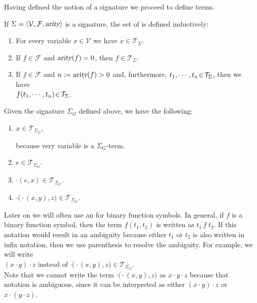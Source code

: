 \noindent
Having defined the notion of a signature we proceed to define terms.

\begin{Definition}
  If $\Sigma = \langle \mathcal{V}, \mathcal{F}, \textsl{arity} \rangle$ is a signature, the set of
     
   is defined inductively:
  \begin{enumerate}
  \item For every variable $x \in \mathcal{V}$ we have $x \in \mathcal{T}_\Sigma$.
  \item If $f \in \mathcal{F}$ and $\textsl{arity}(f) = 0$, then $f \in \mathcal{T}_\Sigma$.
  \item If $f \in \mathcal{F}$ and $n := \textsl{arity}(f) > 0$ and, furthermore, $t_1,\cdots,t_n \!\in\! \mathcal{T}_\Sigma$,  then we have
        \\[0.2cm]
        \hspace*{1.3cm} $f(t_1,\cdots,t_n) \!\in\! \mathcal{T}_\Sigma$.
        \eoxs
  \end{enumerate}
\end{Definition}

\example
Given the signature $\Sigma_G$ defined above, we have the following:
\begin{enumerate}
\item $x \in \mathcal{T}_{\Sigma_G}$,
  
      because very variable is a $\Sigma_{G}$-term.
\item $e \in \mathcal{T}_{\Sigma_G}$.
\item $\cdot(e,x) \in \mathcal{T}_{\Sigma_G}$.
\item $\cdot\bigl(\cdot(x,y),z\bigr) \in \mathcal{T}_{\Sigma_G}$.
\end{enumerate}

\remark
Later on we will often use an  for binary function symbols.  In general, if $f$ is a
binary function symbol, then the term $f(t_1,t_2)$ is written as $t_1 \,f\; t_2$.  If this notation would
result in an ambiguity because either $t_1$ or $t_2$ is also written in infix notation, then we use parenthesis
to resolve the ambiguity.  For example, we will write
\\[0.2cm]
\hspace*{1.3cm}
$(x \cdot y) \cdot z$ \quad instead of \quad $\cdot\bigl(\cdot(x,y),z\bigr) \in \mathcal{T}_{\Sigma_G}$.  
\\[0.2cm]
Note that we cannot write the term $\cdot\bigl(\cdot(x,y),z\bigr)$ as $x \cdot y \cdot z$ because that notation
is ambiguous, since it can be interpreted as either $(x \cdot y) \cdot z$ or $x \cdot (y \cdot z)$.
\eoxs

